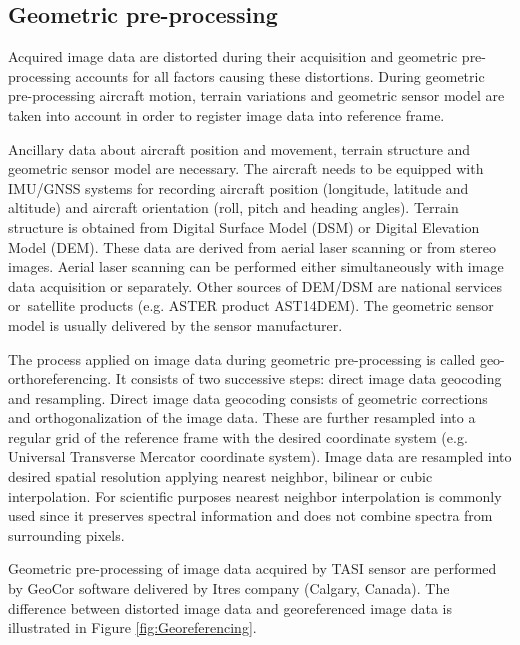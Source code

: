 \subsection*{Geometric pre-processing}

Acquired image data are distorted during their acquisition and geometric pre-processing accounts for all factors causing these distortions. During geometric pre-processing aircraft motion, terrain variations and geometric sensor model are taken into account in order to register image data into reference frame.

Ancillary data about aircraft position and movement, terrain structure and geometric sensor model are necessary. The aircraft needs to be equipped with IMU/GNSS systems for recording aircraft position (longitude, latitude and altitude) and aircraft orientation (roll, pitch and heading angles). Terrain structure is obtained from Digital Surface Model (DSM) or Digital Elevation Model (DEM). These data are derived from aerial laser scanning or from stereo images. Aerial laser scanning can be performed either simultaneously with image data acquisition or separately. Other sources of DEM/DSM are national services or~satellite products (e.g. ASTER product AST14DEM). The geometric sensor model is usually delivered by the sensor manufacturer.

The process applied on image data during geometric pre-processing is called geo-orthoreferencing. It consists of two successive steps: direct image data geocoding and resampling. Direct image data geocoding consists of geometric corrections and orthogonalization of the image data. These are further resampled into a regular grid of the reference frame with the desired coordinate system (e.g. Universal Transverse Mercator coordinate system). Image data are resampled into desired spatial resolution applying nearest neighbor, bilinear or cubic interpolation. For scientific purposes nearest neighbor interpolation is commonly used since it preserves spectral information and does not combine spectra from surrounding pixels.

Geometric pre-processing of image data acquired by TASI sensor are performed by GeoCor software \cite{software:GCSS} delivered by Itres company (Calgary, Canada). The difference between distorted image data and georeferenced image data is illustrated in Figure \ref{fig:Georeferencing}. 

